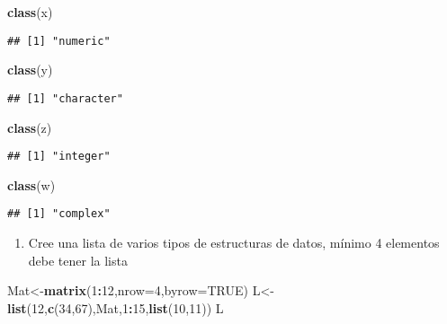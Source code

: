 \documentclass[]{article}
\newenvironment{Shaded}{\begin{snugshade}}{\end{snugshade}}
\newcommand{\KeywordTok}[1]{\textcolor[rgb]{0.13,0.29,0.53}{\textbf{#1}}}
\newcommand{\DataTypeTok}[1]{\textcolor[rgb]{0.13,0.29,0.53}{#1}}
\newcommand{\DecValTok}[1]{\textcolor[rgb]{0.00,0.00,0.81}{#1}}
\newcommand{\OtherTok}[1]{\textcolor[rgb]{0.56,0.35,0.01}{#1}}
\newcommand{\OperatorTok}[1]{\textcolor[rgb]{0.81,0.36,0.00}{\textbf{#1}}}
\newcommand{\NormalTok}[1]{#1}
\providecommand{\tightlist}{%
  \setlength{\itemsep}{0pt}\setlength{\parskip}{0pt}}
\begin{document}
\begin{Shaded}
\begin{Highlighting}[]
\KeywordTok{class}\NormalTok{(x)}
\end{Highlighting}
\end{Shaded}

\begin{verbatim}
## [1] "numeric"
\end{verbatim}

\begin{Shaded}
\begin{Highlighting}[]
\KeywordTok{class}\NormalTok{(y)}
\end{Highlighting}
\end{Shaded}

\begin{verbatim}
## [1] "character"
\end{verbatim}

\begin{Shaded}
\begin{Highlighting}[]
\KeywordTok{class}\NormalTok{(z)}
\end{Highlighting}
\end{Shaded}

\begin{verbatim}
## [1] "integer"
\end{verbatim}

\begin{Shaded}
\begin{Highlighting}[]
\KeywordTok{class}\NormalTok{(w)}
\end{Highlighting}
\end{Shaded}

\begin{verbatim}
## [1] "complex"
\end{verbatim}

\begin{enumerate}
\def\labelenumi{\alph{enumi}.}
\setcounter{enumi}{2}
\tightlist
\item
  Cree una lista de varios tipos de estructuras de datos, mínimo 4
  elementos debe tener la lista
\end{enumerate}

\begin{Shaded}
\begin{Highlighting}[]
\NormalTok{Mat<-}\KeywordTok{matrix}\NormalTok{(}\DecValTok{1}\OperatorTok{:}\DecValTok{12}\NormalTok{,}\DataTypeTok{nrow=}\DecValTok{4}\NormalTok{,}\DataTypeTok{byrow=}\OtherTok{TRUE}\NormalTok{)}
\NormalTok{L<-}\KeywordTok{list}\NormalTok{(}\DecValTok{12}\NormalTok{,}\KeywordTok{c}\NormalTok{(}\DecValTok{34}\NormalTok{,}\DecValTok{67}\NormalTok{),Mat,}\DecValTok{1}\OperatorTok{:}\DecValTok{15}\NormalTok{,}\KeywordTok{list}\NormalTok{(}\DecValTok{10}\NormalTok{,}\DecValTok{11}\NormalTok{))}
\NormalTok{L}
\end{Highlighting}
\end{Shaded}
\end{document}
